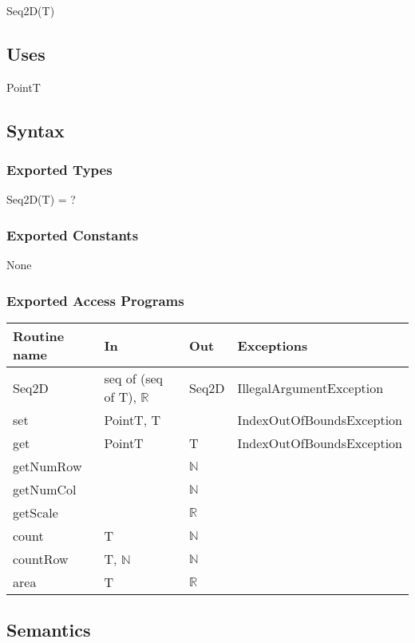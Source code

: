 \documentclass[12pt]{article}
\begin{document}
Seq2D(T)

\subsection* {Uses}

PointT

\subsection* {Syntax}

\subsubsection* {Exported Types}

Seq2D(T) = ?

\subsubsection* {Exported Constants}

None

\subsubsection* {Exported Access Programs}

\begin{tabular}{| l | l | l | p{6cm} |}
\hline
\textbf{Routine name} & \textbf{In} & \textbf{Out} & \textbf{Exceptions}\\
\hline
Seq2D & seq of (seq of T), $\mathbb{R}$ & Seq2D & IllegalArgumentException\\
\hline
set & PointT, T & ~ & IndexOutOfBoundsException\\
\hline
get & PointT & T & IndexOutOfBoundsException\\
\hline
getNumRow & ~ & $\mathbb{N}$ & \\
\hline
getNumCol & ~ & $\mathbb{N}$ & \\
\hline
getScale & ~ & $\mathbb{R}$ & \\
\hline
count & T & $\mathbb{N}$ & \\
\hline
countRow & T, $\mathbb{N}$ & $\mathbb{N}$ & \\
\hline
area & T & $\mathbb{R}$ & \\
\hline
\end{tabular}

\subsection* {Semantics}
\end{document}
